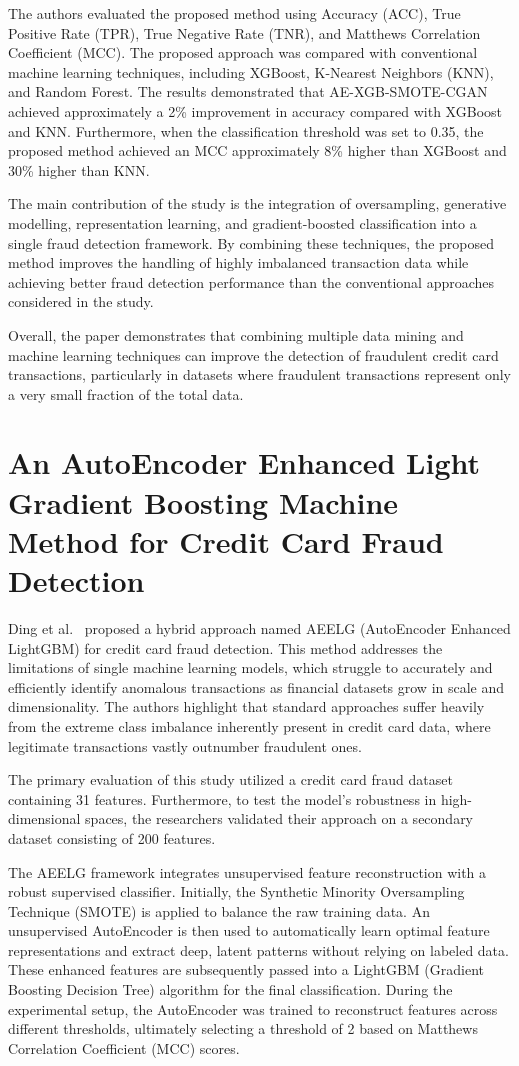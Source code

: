 \documentclass[12pt, a4paper]{report}
\begin{document}
The authors evaluated the proposed method using Accuracy (ACC), True Positive Rate (TPR), True Negative Rate (TNR), and Matthews Correlation Coefficient (MCC). The proposed approach was compared with conventional machine learning techniques, including XGBoost, K-Nearest Neighbors (KNN), and Random Forest. The results demonstrated that AE-XGB-SMOTE-CGAN achieved approximately a 2\% improvement in accuracy compared with XGBoost and KNN. Furthermore, when the classification threshold was set to 0.35, the proposed method achieved an MCC approximately 8\% higher than XGBoost and 30\% higher than KNN.

The main contribution of the study is the integration of oversampling, generative modelling, representation learning, and gradient-boosted classification into a single fraud detection framework. By combining these techniques, the proposed method improves the handling of highly imbalanced transaction data while achieving better fraud detection performance than the conventional approaches considered in the study.

Overall, the paper demonstrates that combining multiple data mining and machine learning techniques can improve the detection of fraudulent credit card transactions, particularly in datasets where fraudulent transactions represent only a very small fraction of the total data.

\section{An AutoEncoder Enhanced Light Gradient Boosting Machine Method for Credit Card Fraud Detection}
Ding et al.~\cite{ding2024autoencoder} proposed a hybrid approach named AEELG (AutoEncoder Enhanced LightGBM) for credit card fraud detection. This method addresses the limitations of single machine learning models, which struggle to accurately and efficiently identify anomalous transactions as financial datasets grow in scale and dimensionality. The authors highlight that standard approaches suffer heavily from the extreme class imbalance inherently present in credit card data, where legitimate transactions vastly outnumber fraudulent ones.

The primary evaluation of this study utilized a credit card fraud dataset containing 31 features. Furthermore, to test the model's robustness in high-dimensional spaces, the researchers validated their approach on a secondary dataset consisting of 200 features.

The AEELG framework integrates unsupervised feature reconstruction with a robust supervised classifier. Initially, the Synthetic Minority Oversampling Technique (SMOTE) is applied to balance the raw training data. An unsupervised AutoEncoder is then used to automatically learn optimal feature representations and extract deep, latent patterns without relying on labeled data. These enhanced features are subsequently passed into a LightGBM (Gradient Boosting Decision Tree) algorithm for the final classification. During the experimental setup, the AutoEncoder was trained to reconstruct features across different thresholds, ultimately selecting a threshold of 2 based on Matthews Correlation Coefficient (MCC) scores.
\end{document}

